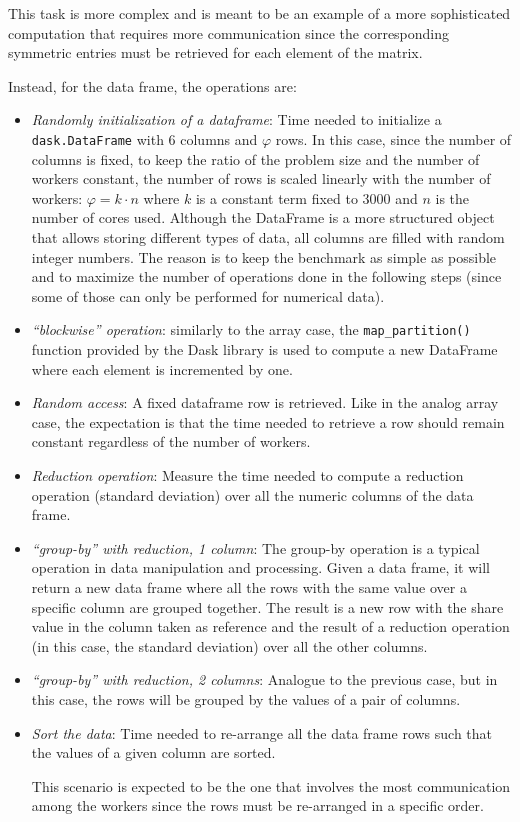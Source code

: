 \begin{itemize}
    This task is more complex and is meant to be an example of a more
    sophisticated computation that requires more communication since the
    corresponding symmetric entries must be retrieved for each element of the
    matrix.
\end{itemize}

Instead, for the data frame, the operations are:

\begin{itemize}
  \itemsep0em
  \item \textit{Randomly initialization of a dataframe}: Time needed to
    initialize a  \texttt{dask.DataFrame} with $6$ columns and $\varphi$ rows.
    In this case, since the number of columns is fixed, to keep the ratio of the
    problem size and the number of workers constant, the number of rows is
    scaled linearly with the number of workers: $\varphi = k \cdot n$ where $k$
    is a constant term fixed to $3000$ and $n$ is the number of cores used.
    Although the DataFrame is a more structured object that allows storing
    different types of data, all columns are filled with random integer numbers.
    The reason is to keep the benchmark as simple as possible and to maximize
    the number of operations done in the following steps (since some of those
    can only be performed for numerical data).
  \item \textit{``blockwise'' operation}: similarly to the array case, the
    \texttt{map\_partition()} function provided by the Dask library is used to
    compute a new DataFrame where each element is incremented by one.
  \item \textit{Random access}: A fixed dataframe row is retrieved.
    Like in the analog array case, the expectation is that the time needed to
    retrieve a row should remain constant regardless of the number of workers.
  \item \textit{Reduction operation}: Measure the time needed to compute a
    reduction operation (standard deviation) over all the numeric columns of the
    data frame.
  \item \textit{``group-by'' with reduction, 1 column}: The group-by operation
    is a typical operation in data manipulation and processing. Given a data
    frame, it will return a new data frame where all the rows with the same
    value over a specific column are grouped together. The result is a new row
    with the share value in the column taken as reference and the result of a
    reduction operation (in this case, the standard deviation) over all the
    other columns.
  \item \textit{``group-by'' with reduction, 2 columns}: Analogue to the
    previous case, but in this case, the rows will be grouped by the values of a
    pair of columns.
  \item \textit{Sort the data}: Time needed to re-arrange all the data frame
    rows such that the values of a given column are sorted.

    This scenario is expected to be the one that involves the most communication
    among the workers since the rows must be re-arranged in a specific order.
\end{itemize}

